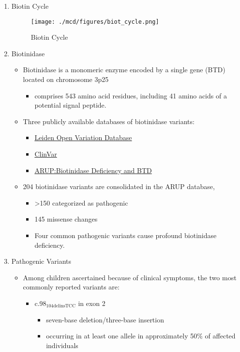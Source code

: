 \documentclass{scrartcl}
\begin{document}
\begin{enumerate}
\item Biotin Cycle
\label{sec:org5eb736a}
\begin{figure}[htbp]
\centering
\texttt{[image: ./mcd/figures/biot\_cycle.png]}
\caption[Biotin Cycle]{\label{fig:orgc0fce65}
Biotin Cycle}
\end{figure}


\item Biotinidase
\label{sec:org3640277}

\begin{itemize}
\item Biotinidase is a monomeric enzyme encoded by a single gene (BTD) located on chromosome 3p25
\begin{itemize}
\item comprises 543 amino acid residues, including 41 amino acids of a potential signal peptide.
\end{itemize}

\item Three publicly available databases of biotinidase variants:
\begin{itemize}
\item \href{https://grenada.lumc.nl/LOVD2/shared1/home.php?select\_db=BTD}{Leiden Open Variation Database}
\item \href{https://www.ncbi.nlm.nih.gov/clinvar/}{ClinVar}
\item \href{http://www.arup.utah.edu/database/BTD/BTD\_welcome.php}{ARUP:Biotinidase Deficiency and BTD}
\end{itemize}

\item 204 biotinidase variants are consolidated in the ARUP database,
\begin{itemize}
\item >150 categorized as pathogenic
\item 145 missense changes
\item Four common pathogenic variants cause profound biotinidase deficiency.
\end{itemize}
\end{itemize}

\item Pathogenic Variants
\label{sec:org2f6d0e6}
\begin{itemize}
\item Among children ascertained because of clinical symptoms, the two
most commonly reported variants are:

\begin{itemize}
\item c.98\(_{\text{104delinsTCC}}\) in exon 2
\begin{itemize}
\item seven-base deletion/three-base insertion
\item occurring in at least one allele in approximately 50\% of affected individuals
\end{itemize}


\end{itemize}
\end{itemize}
\end{enumerate}
\end{document}
